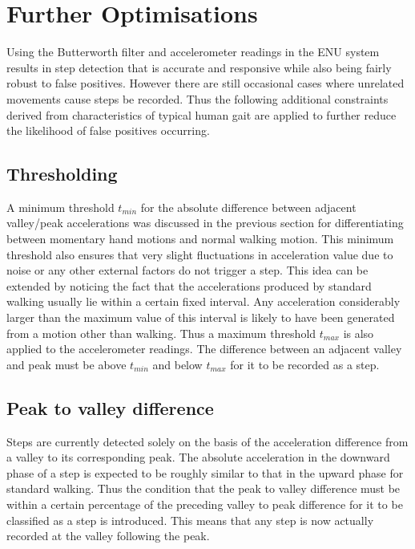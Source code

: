 \documentclass[12pt,a4paper,notitlepage]{report}
\begin{document}
\section*{Further Optimisations}

Using the Butterworth filter and accelerometer readings in the ENU system results in step detection that is accurate and responsive while also being fairly robust to false positives. However there are still occasional cases where unrelated movements cause steps be recorded. Thus the following additional constraints derived from characteristics of typical human gait are applied to further reduce the likelihood of false positives occurring.  

\subsection*{Thresholding}

A minimum threshold $t_{min}$ for the absolute difference between adjacent valley/peak accelerations was discussed in the previous section for differentiating between momentary hand motions and normal walking motion. This minimum threshold also ensures that very slight fluctuations in acceleration value due to noise or any other external factors do not trigger a step. This idea can be extended by noticing the fact that the accelerations produced by standard walking usually lie within a certain fixed interval. Any acceleration considerably larger than the maximum value of this interval is likely to have been generated from a motion other than walking. Thus a maximum threshold $t_{max}$ is also applied to the accelerometer readings. The difference between an adjacent valley and peak must be above $t_{min}$ and below $t_{max}$ for it to be recorded as a step. 

\subsection*{Peak to valley difference}

Steps are currently detected solely on the basis of the acceleration difference from a valley to its corresponding peak. The absolute acceleration in the downward phase of a step is expected to be roughly similar to that in the upward phase for standard walking. Thus the condition that the peak to valley difference must be within a certain percentage of the preceding valley to peak difference for it to be classified as a step is introduced. This means that any step is now actually recorded at the valley following the peak.   
\end{document}
